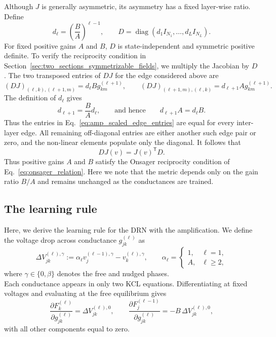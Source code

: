 \documentclass{article}
\begin{document}
Although \(J\) is generally asymmetric, its asymmetry has a fixed
layer-wise ratio. Define
\begin{equation}
d_\ell=
\left(\frac{B}{A}\right)^{\ell-1},
\qquad
D=
\operatorname{diag}
\left(
d_1 I_{N_1},
\dots,
d_L I_{N_L}
\right).
\label{eq:amp_layer_metric}
\end{equation}
For fixed positive gains \(A\) and \(B\), \(D\) is state-independent and
symmetric positive definite. To verify the reciprocity condition in
Section~\ref{sec:two_sections_symmetrizable_fields}, we multiply the
Jacobian by $D$. The two transposed entries of $DJ$ for the edge
considered above are
\begin{equation}
\left(DJ\right)_{(\ell,k),(\ell+1,m)}
=
d_\ell B g_{km}^{(\ell+1)},
\qquad
\left(DJ\right)_{(\ell+1,m),(\ell,k)}
=
d_{\ell+1}A g_{km}^{(\ell+1)}.
\label{eq:amp_scaled_edge_entries}
\end{equation}
The definition of \(d_\ell\) gives
\begin{equation}
d_{\ell+1}=\frac{B}{A}d_\ell,
\qquad\text{and hence}\qquad
d_{\ell+1}A=d_\ell B.
\label{eq:amp_layer_balance}
\end{equation}
Thus the entries in Eq.~\eqref{eq:amp_scaled_edge_entries} are equal for every
inter-layer edge. All remaining off-diagonal entries are either another such
edge pair or zero, and the non-linear elements populate only the diagonal. It follows that
\begin{equation}
D J(v)=J(v)^{\mathsf T}D.
\label{eq:amp_weighted_symmetry}
\end{equation}
Thus positive gains \(A\) and \(B\) satisfy the Onsager reciprocity
condition of Eq.~\eqref{eq:onsager_relation}. Here we note that the metric depends only on the
gain ratio \(B/A\) and remains unchanged as the conductances are trained.


\subsection{The learning rule}
Here, we derive the learning rule for the DRN with the amplification.
We define the voltage drop across conductance $g_{jk}^{(\ell)}$ as
\begin{equation}
\Delta V_{jk}^{(\ell),\gamma}
:=
\alpha_\ell v_j^{(\ell-1),\gamma}
-
v_k^{(\ell),\gamma},
\qquad
\alpha_\ell=
\begin{cases}
1, & \ell=1,\\
A, & \ell\geq2,
\end{cases}
\label{eq:amp_branch_voltage_drop}
\end{equation}
where $\gamma\in\{0,\beta\}$ denotes the free and nudged phases.
\\
Each conductance appears in only two KCL equations.
Differentiating at fixed voltages and evaluating at the free
equilibrium gives
\begin{equation}
\frac{\partial F_k^{(\ell)}}{\partial g_{jk}^{(\ell)}}
=
\Delta V_{jk}^{(\ell),0},
\qquad
\frac{\partial F_j^{(\ell-1)}}{\partial g_{jk}^{(\ell)}}
=
-B\,\Delta V_{jk}^{(\ell),0},
\label{eq:amp_conductance_sensitivities}
\end{equation}
with all other components equal to zero.
\end{document}

